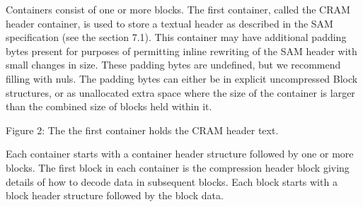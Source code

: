 \documentclass[a4paper]{article}
\begin{document}
Containers consist of one or more blocks. The first container, called the CRAM header container,
is used to store a textual header as described in the SAM specification (see the section 7.1).
This container may have additional padding bytes present for purposes
of permitting inline rewriting of the SAM header with small changes in
size. These padding bytes are undefined, but we recommend filling with
nuls.  The padding bytes can either be in explicit uncompressed Block
structures, or as unallocated extra space where the size of the
container is larger than the combined size of blocks held within it.


\begin{center}

Figure 2: The the first container holds the CRAM header text.
\end{center}

Each container starts with a container header structure followed by
one or more blocks.
The first block in each container is the compression header block
giving details of how to decode data in subsequent blocks.
Each block starts with a block header structure followed by the block
data.
\end{document}
